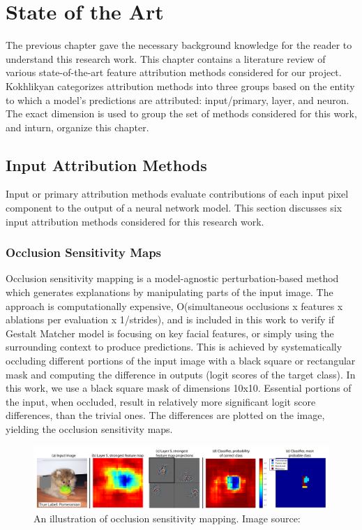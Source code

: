 \documentclass[../report.tex]{subfiles}
\begin{document}
    \chapter{State of the Art}\label{ch_sota}
    \noindent
	The previous chapter gave the necessary background knowledge for the reader to understand this research work. This chapter contains a literature review of various state-of-the-art feature attribution methods considered for our project. Kokhlikyan \etal \cite{kokhlikyan2020captum} categorizes attribution methods into three groups based on the entity to which a model's predictions are attributed: input/primary, layer, and neuron. The exact dimension is used to group the set of methods considered for this work, and inturn, organize this chapter.
 
    \section{Input Attribution Methods}
    \noindent
    Input or primary attribution methods evaluate contributions of each input pixel component to the output of a neural network model. This section discusses six input attribution methods considered for this research work.
    \subsection{Occlusion Sensitivity Maps}
    \noindent
    Occlusion sensitivity mapping \cite{matthew2014visualizing} is a model-agnostic perturbation-based method which generates explanations by manipulating parts of the input image. The approach is computationally expensive, O(simultaneous occlusions x features x ablations per evaluation x 1/strides), and is included in this work to verify if Gestalt Matcher model is focusing on key facial features, or simply using the surrounding context to produce predictions. This is achieved by systematically occluding different portions of the input image with a black square or rectangular mask and computing the difference in outputs (logit scores of the target class). In this work, we use a  black square mask of dimensions 10x10. Essential portions of the input, when occluded, result in relatively more significant logit score differences, than the trivial ones. The differences are plotted on the image, yielding the occlusion sensitivity maps.
    
    \begin{figure}[H]
    	\includegraphics[width=\textwidth]{images/occlusion_sensitivity_map}
    	\caption[An illustration of occlusion sensitivity mapping]{An illustration of occlusion sensitivity mapping. Image source: \cite{matthew2014visualizing}}
    	\label{osm}
    \end{figure}
    
\end{document}
